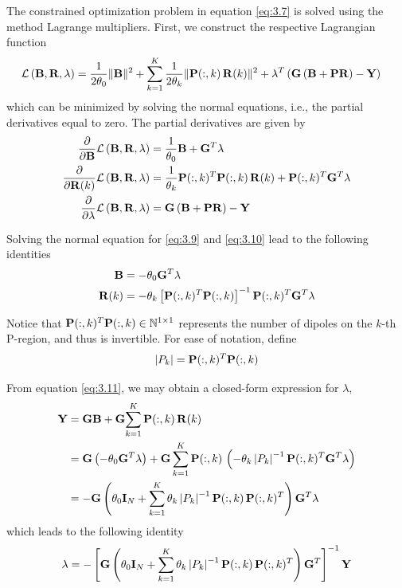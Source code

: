 The constrained optimization problem in equation \eqref{eq:3.7} is solved using the method Lagrange multipliers.
%
First, we construct the respective Lagrangian function
\begin{align}
    \mathcal{L}\left( \mathbf{B}, \mathbf{R}, \lambda \right) &=
    \frac{1}{2 \theta_0} \lVert \mathbf{B} \rVert^2
    +
    \sum_{k=1}^K \frac{1}{2 \theta_k} \lVert \mathbf{P}(:,k)\, \mathbf{R}(k) \rVert^2
    +
    \lambda^T \left( {\mathbf{G} \left( \mathbf{B} + \mathbf{P} \mathbf{R} \right) } - \mathbf{Y} \right)
\end{align}
which can be minimized by solving the normal equations, i.e., the partial derivatives equal to zero.
%
The partial derivatives are given by
\begin{align}
    \frac{\partial}{\partial \mathbf{B}} \mathcal{L}\left( \mathbf{B}, \mathbf{R}, \lambda \right)
    &=
    \frac{1}{\theta_0} \mathbf{B} + \mathbf{G}^T \lambda 
    \label{eq:3.9}
    \\
    \frac{\partial}{\partial \mathbf{R}(k)} \mathcal{L}\left( \mathbf{B}, \mathbf{R}, \lambda \right)
    &=
    \frac{1}{\theta_k} \mathbf{P}(:,k)^T \mathbf{P}(:,k)\, \mathbf{R}(k) + \mathbf{P}(:,k)^T \mathbf{G}^T \lambda 
    \label{eq:3.10}
    \\
    \frac{\partial}{\partial \lambda} \mathcal{L}\left( \mathbf{B}, \mathbf{R}, \lambda \right)
    &=
    \mathbf{G} \left(  \mathbf{B} + \mathbf{P} \mathbf{R}  \right) - \mathbf{Y}
    \label{eq:3.11}
\end{align}

Solving the normal equation for \eqref{eq:3.9} and \eqref{eq:3.10} lead to the following identities
\begin{align}
    \mathbf{B} &= -\theta_0 \mathbf{G}^T \lambda
    \label{eq:3.13}
    \\
    \mathbf{R}(k)
    &=
    -\theta_k \left[ \mathbf{P}(:,k)^T \mathbf{P}(:,k) \right]^{-1} \mathbf{P}(:,k)^T \mathbf{G}^T \lambda 
    \label{eq:3.14}
\end{align}

Notice that $\mathbf{P}(:,k)^T \mathbf{P}(:,k) \in \mathbb{N}^{1\times 1}$ represents the number of dipoles on the $k$-th P-region, and thus is invertible.
%
For ease of notation, define
\begin{equation}
    \left| {P_k} \right| = \mathbf{P}(:,k)^T \mathbf{P}(:,k)
\end{equation}

From equation \eqref{eq:3.11}, we may obtain a closed-form expression for $\lambda$,
\begin{align}
    \mathbf{Y}
    &=
    \mathbf{G} \mathbf{B} + \mathbf{G} { \sum_{k=1}^K { \mathbf{P}(:,k)\, \mathbf{R}(k) } }
    \nonumber \\
    &=
    \mathbf{G}\left( -\theta_0 \mathbf{G}^T \lambda \right)
    + \mathbf{G} \sum_{k=1}^K
    { \mathbf{P}(:,k)\, \left( -\theta_k \left| {P_k} \right|^{-1} \mathbf{P}(:,k)^T \mathbf{G}^T \lambda \right)}
    \nonumber \\
    &=
    -\mathbf{G} \left(  \theta_0 \mathbf{I}_N + \sum_{k=1}^K \theta_k \left| {P_k} \right|^{-1} 
    \mathbf{P}(:,k)\, \mathbf{P}(:,k)^T
     \right) \mathbf{G}^T \lambda
\end{align}
which leads to the following identity
\begin{equation}
    \lambda
    =
    -\left[ \mathbf{G} \left(  \theta_0 \mathbf{I}_N + \sum_{k=1}^K \theta_k \left| {P_k} \right|^{-1} 
    \mathbf{P}(:,k)\, \mathbf{P}(:,k)^T
     \right) \mathbf{G}^T \right]^{-1} \mathbf{Y}
\end{equation}

